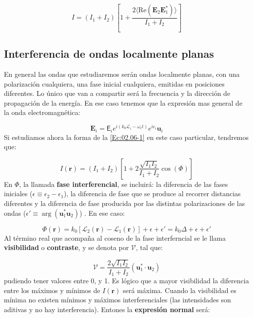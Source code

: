 \documentclass[12pt,a4paper]{book}
\numberwithin{equation}{section}
\numberwithin{figure}{section}
\newcommand{\parentesis}[1]{\left( #1  \right)}
\newcommand{\ccorchetes}[1]{\left[ #1  \right]}
\newcommand{\1}{_{(1)}}
\newcommand{\2}{_{(2)}}
\newcommand{\Real}{\mathrm{Re} }
\newcommand{\un}{\mathbf{u}}
\newcommand{\rn}{\mathbf{r}}
\newcommand{\En}{\mathbf{E}}
\theoremstyle{definition}
\begin{document}
\begin{equation}
I = (I_1+I_2)\ccorchetes{1+\frac{2 \langle \Real (\En_2 \En_1^* ) \rangle  }{I_1 + I_2}}
\end{equation}



\subsection{Interferencia de ondas localmente planas}

En general las ondas que estudiaremos serán ondas localmente planas, con una polarización cualquiera, una fase inicial cualquiera, emitidas en posiciones diferentes. Lo único que van a compartir será la frecuencia y la dirección de propagación de la energía. En ese caso tenemos que la expresión mas general de la onda electromagnética:

\begin{equation}
\En_i = \mathsf{E}_i e^{i(k_0 \mathcal{L}_i - \omega_c t)} e^{i \epsilon_i} \un_i
\end{equation}
Si estudiamos ahora la forma de la \ref{Ec:02.06-1} en este caso particular, tendremos que:

\begin{equation}
I(\rn) = \parentesis{I_1+I_2}\ccorchetes{1+2\frac{\sqrt{I_1 I_2}}{I_1+I_2} \cos (\Phi)}
\end{equation}
En $\Phi$, la llamada \textbf{fase interferencial}, se incluirá: la diferencia de las fases iniciales ($\epsilon \equiv \epsilon_2 - \epsilon_1$), la diferencia de fase que se produce al recorrer distancias diferentes y la diferencia de fase producida por las distintas polarizaciones de las ondas ($\epsilon'\equiv \arg (\un_1^* \un_2)$) . En ese caso:

\begin{equation}
\Phi (\rn) = k_0 [\mathcal{L}_2 (\rn) - \mathcal{L}_1 (\rn)] + \epsilon + \epsilon' =  k_0  \Delta + \epsilon + \epsilon'  \label{Ec:02.05-01-Fase}
\end{equation}
Al término real que acompaña al coseno de la fase interferncial se le llama \textbf{visibilidad} o \textbf{contraste}, y se denota por $\mathcal{V}$, tal que:

\begin{equation}
\mathcal{V} = \frac{2 \sqrt{I_1 I_2} }{I_1 + I_2} (\un_1^* \cdot \un_2) \label{Ec:02.05-02-Visibilidad}
\end{equation}
pudiendo tener valores entre 0, y 1. Es lógico que a mayor visibilidad la diferencia entre los máximos y mínimos de $I(\rn)$ será máxima. Cuando la visibilidad es mínima no existen mínimos y máximos interferenciales (las intensidades son aditivas y no hay interferencia). Entones la \textbf{expresión normal} será:
\end{document}
